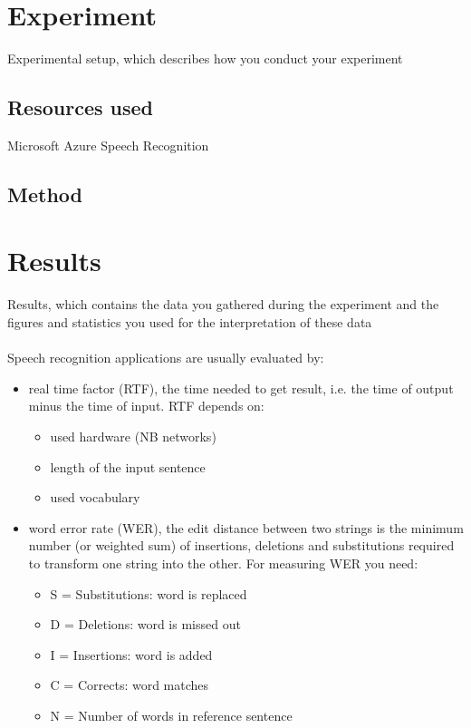 \documentclass{article}
\begin{document}
\section{Experiment}
Experimental setup, which describes how you conduct your experiment
\subsection{Resources used}
Microsoft Azure Speech Recognition
\subsection{Method}

\section{Results}
Results, which contains the data you gathered during the experiment and the
figures and statistics you used for the interpretation of these data \\
\\
Speech recognition applications are usually evaluated by:

\begin{itemize}
    \item real time factor (RTF), the time needed to get result, i.e. the time of output minus the time of input. RTF depends on:
    \begin{itemize}
        \item used hardware (NB networks)
        \item length of the input sentence
        \item used vocabulary
    \end{itemize}
    \item word error rate (WER), the edit distance between two strings is the minimum number (or weighted sum) of insertions, deletions and substitutions required to transform one string into the other. For measuring WER you need:
    \begin{itemize}
        \item S = Substitutions: word is replaced
        \item D = Deletions: word is missed out
        \item I = Insertions: word is added
        \item C = Corrects: word matches
        \item N = Number of words in reference sentence
    \end{itemize}
\end{itemize}
\end{document}
